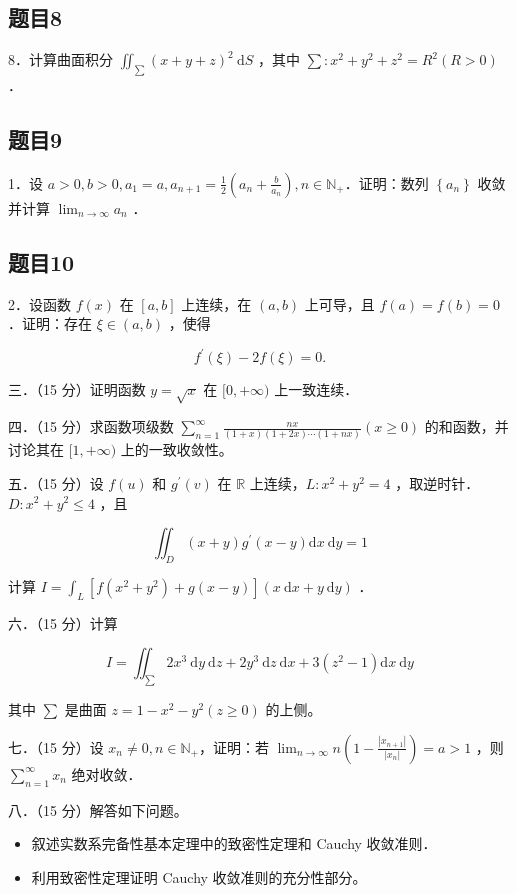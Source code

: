 \documentclass{article}
\begin{document}
\subsection{题目8}
8．计算曲面积分 \(\iint_{\sum}(x+y+z)^{2} \mathrm{~d} S\) ，其中 \(\sum: x^{2}+y^{2}+z^{2}=R^{2}(R>0)\) ．

\subsection{题目9}
1．设 \(a>0, b>0, a_{1}=a, a_{n+1}=\frac{1}{2}\left(a_{n}+\frac{b}{a_{n}}\right), n \in \mathbb{N}_{+}\)．证明：数列 \(\left\{a_{n}\right\}\) 收敛并计算 \(\lim _{n \rightarrow \infty} a_{n}\) ．

\subsection{题目10}
2．设函数 \(f(x)\) 在 \([a, b]\) 上连续，在 \((a, b)\) 上可导，且 \(f(a)=f(b)=0\) ．证明：存在 \(\xi \in(a, b)\) ，使得

\[
f^{\prime}(\xi)-2 f(\xi)=0 .
\]

三．（15 分）证明函数 \(y=\sqrt{x}\) 在 \([0,+\infty)\) 上一致连续．

四．（15 分）求函数项级数 \(\sum_{n=1}^{\infty} \frac{n x}{(1+x)(1+2 x) \cdots(1+n x)}(x \geq 0)\) 的和函数，并讨论其在 \([1,+\infty)\) 上的一致收敛性。

五．（15 分）设 \(f(u)\) 和 \(g^{\prime}(v)\) 在 \(\mathbb{R}\) 上连续，\(L: x^{2}+y^{2}=4\) ，取逆时针．\(D: x^{2}+y^{2} \leq 4\) ，且

\[
\iint_{D}(x+y) g^{\prime}(x-y) \mathrm{d} x \mathrm{~d} y=1
\]

计算 \(I=\int_{L}\left[f\left(x^{2}+y^{2}\right)+g(x-y)\right](x \mathrm{~d} x+y \mathrm{~d} y)\) ．

六．（15 分）计算

\[
I=\iint_{\sum} 2 x^{3} \mathrm{~d} y \mathrm{~d} z+2 y^{3} \mathrm{~d} z \mathrm{~d} x+3\left(z^{2}-1\right) \mathrm{d} x \mathrm{~d} y
\]

其中 \(\sum\) 是曲面 \(z=1-x^{2}-y^{2}(z \geq 0)\) 的上侧。

七．（15 分）设 \(x_{n} \neq 0, n \in \mathbb{N}_{+}\)，证明：若 \(\lim _{n \rightarrow \infty} n\left(1-\frac{\left|x_{n+1}\right|}{\left|x_{n}\right|}\right)=a>1\) ，则 \(\sum_{n=1}^{\infty} x_{n}\) 绝对收敛．

八．（15 分）解答如下问题。

\begin{itemize}
  \item[（1）] 叙述实数系完备性基本定理中的致密性定理和 Cauchy 收敛准则．
  \item[（2）] 利用致密性定理证明 Cauchy 收敛准则的充分性部分。
\end{itemize}
\end{document}
